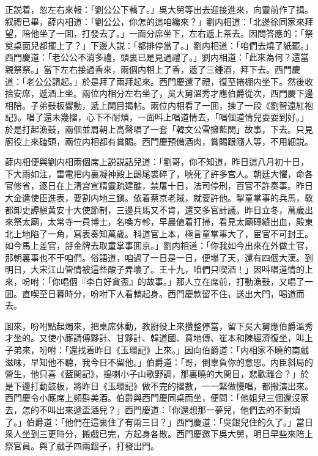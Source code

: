 正説着，忽左右來報：「劉公公下轎了。」吳大舅等出去迎接進來，向靈前作了揖。叙禮已畢，薛内相道：「劉公公，你怎的這咱纔來？」劉内相道：「北邊徐同家來拜望，陪他坐了一囬，打發去了。」一面分席坐下，左右遞上茶去。因問答應的：「祭奠桌面兒都擺上了？」下邊人説：「都排停當了。」劉内相道：「咱們去燒了紙罷。」西門慶道：「老公公不消多禮，頭裏已是見過禮了。」劉内相道：「此來為何？還當親祭祭。」當下左右接過香來，兩個内相上了香，遞了三鍾酒，拜下去。西門慶道：「老公公請起。」於是拜了兩拜起來。西門慶還了禮，復至捲棚内坐下。然後收拾安席，遞酒上坐。兩位内相分左右坐了，吳大舅溫秀才應伯爵從次，西門慶下邊相陪。子弟鼓板響動，遞上関目揭帖。兩位内相看了一囬，揀了一段《劉智遠紅袍記》。唱了還未幾摺，心下不耐煩，一面呌上唱道情去，「唱個道情兒耍耍到好。」於是打起漁鼓，兩個並肩朝上高聲唱了一套「韓文公雪擁藍関」故事，下去。只見廚役上來磕頭，兩位内相都有賞賜。西門慶預備酒肉，賞賜跟隨人等，不用細説。

薛内相便與劉内相兩個席上説説話兒道：「劉哥，你不知道，昨日這八月初十日，下大雨如注，雷電把内裏凝神殿上鴟尾裘碎了，唬死了許多宫人。朝廷大懼，命各官修省，逐日在上清宫宣精靈疏建醮，禁屠十日，法司停刑，百官不許奏事。昨日大金遣使臣進表，要割内地三鎭。依着蔡京老賊，就要許他。掣童掌事的兵馬，敎都卸史譚稹黄安十大使節制，三邊兵馬又不肯，還交多官計議。昨日立冬，萬歲出來祭太廟，太常寺一員博士，名喚方軫，早晨値着打掃，看見太廟磚縫出血，殿東北上地陷了一角，寫表奏知萬歲。科道官上本，極言童掌事大了，宦官不可封王。如今馬上差官，㧱金牌去取童掌事囬京。」劉内相道：「你我如今出來在外做土官，那朝裏事也不干咱們。俗語道，咱過了一日是一日，便塌了天，還有四個大漢。到明日，大宋江山管情被這些酸子弄壞了。王十九，咱們只喫酒！」因呌唱道情的上來，吩咐：「你唱個『李白好貪盃』的故事。」那人立在席前，打動漁鼓，又唱了一囬。直喫至日暮時分，吩咐下人看轎起身。西門慶款留不住，送出大門，喝道而去。

囬來，吩咐點起燭來，把桌席休動，教廚役上來攢整停當，留下吳大舅應伯爵溫秀才坐的。又使小廝請傅夥計、甘夥計、韓道國、賁地傳、崔本和陳經濟復坐，叫上子弟來，吩咐：「還找着昨日《玉環記》上來。」因向伯爵道：「内相家不曉的南戲滋味，早知他不聽，我今日不留他。」伯爵道：「哥，倒辜負你的意思。内臣斜局的營生，他只喜《藍関記》，搗喇小子山歌野調，那裏曉的大関目，悲歡離合？」於是下邊打動鼓板，將昨日《玉環記》做不完的摺數，一一緊做慢唱，都搬演出來。西門慶令小廝席上頻斟美酒。伯爵與西門慶同桌而坐，便問：「他姐兒三個還沒家去，怎的不叫出來遞盃酒兒？」西門慶道：「你還想那一夢兒，他們去的不耐煩了。」伯爵道：「他們在這裏住了有兩三日？」西門慶道：「吳銀兒住的久了。」當日衆人坐到三更時分，搬戲已完，方起身各散。西門慶邀下吳大舅，明日早些來陪上祭官員。與了戲子四兩銀子，打發出門。

